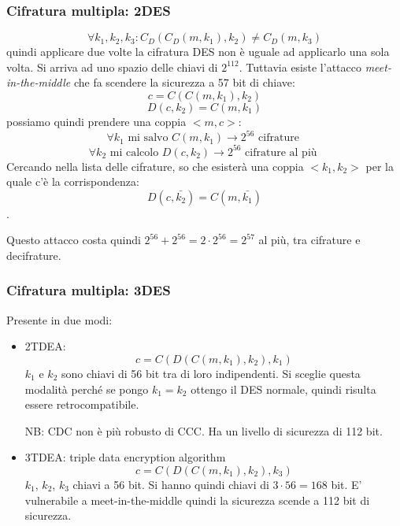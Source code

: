 \subsubsection{Cifratura multipla: 2DES}
$$ \forall k_1, k_2, k_3: C_D(C_D(m, k_1), k_2) \neq C_D(m, k_3) $$
quindi applicare due volte la cifratura DES non è uguale ad applicarlo una sola volta.
Si arriva ad uno spazio delle chiavi di $2^{112}$.
Tuttavia esiste l'attacco \emph{meet-in-the-middle} che fa scendere la sicurezza a 57 bit di chiave:
$$ c = C(C(m,k_1), k_2) $$
$$ D(c,k_2) = C(m,k_1) $$
possiamo quindi prendere una coppia $<m, c>$:
$$ \forall k_1 \text{ mi salvo } C(m, k_1) \xrightarrow{} 2^{56} \text{ cifrature }$$
$$ \forall k_2 \text{ mi calcolo } D(c, k_2) \xrightarrow{} 2^{56} \text{ cifrature al più }$$
Cercando nella lista delle cifrature, so che esisterà una coppia $<k_1, k_2>$ per la quale c'è la corrispondenza:
$$ D(c, \bar{k_2}) = C(m, \bar{k_1}) $$.

Questo attacco costa quindi $2^{56} + 2^{56} = 2 \cdot 2^{56} = 2^{57}$ al più, tra cifrature e decifrature.

\subsubsection{Cifratura multipla: 3DES}
Presente in due modi:
\begin{itemize}
    \item 2TDEA:
        $$ c = C(D(C(m, k_1), k_2), k_1) $$
        $k_1$ e $k_2$ sono chiavi di 56 bit tra di loro indipendenti. Si sceglie questa modalità perché se pongo $k_1 = k_2$ ottengo il DES normale, quindi risulta essere retrocompatibile.
        
        NB: CDC non è più robusto di CCC. Ha un livello di sicurezza di 112 bit.
    \item 3TDEA: triple data encryption algorithm
        $$ c = C(D(C(m, k_1), k_2), k_3) $$
        $k_1$, $k_2$, $k_3$ chiavi a 56 bit. Si hanno quindi chiavi di $3 \cdot 56 = 168$ bit. E' vulnerabile a meet-in-the-middle quindi la sicurezza scende a 112 bit di sicurezza.
\end{itemize}